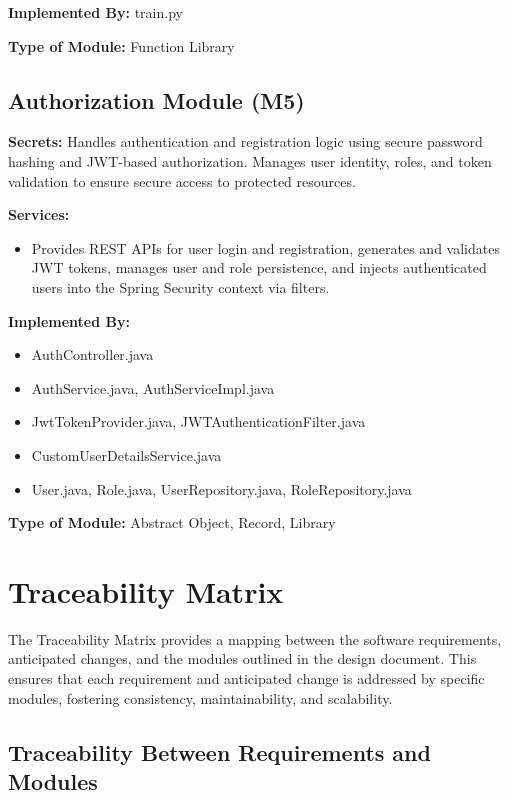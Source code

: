 \documentclass[12pt, titlepage]{article}
\begin{document}
\textbf{Implemented By:} train.py

\textbf{Type of Module:} Function Library

\subsection{Authorization Module (M5)}

\textbf{Secrets:} Handles authentication and registration logic using secure password hashing and JWT-based authorization. Manages user identity, roles, and token validation to ensure secure access to protected resources.

\textbf{Services:} 
\begin{itemize}
    \item Provides REST APIs for user login and registration, generates and validates JWT tokens, manages user and role persistence, and injects authenticated users into the Spring Security context via filters.
\end{itemize}

\textbf{Implemented By:} 
\begin{itemize}
    \item AuthController.java
    \item AuthService.java, AuthServiceImpl.java
    \item JwtTokenProvider.java, JWTAuthenticationFilter.java
    \item CustomUserDetailsService.java
    \item User.java, Role.java, UserRepository.java, RoleRepository.java
\end{itemize}

\textbf{Type of Module:} Abstract Object, Record, Library

\section{Traceability Matrix}

The Traceability Matrix provides a mapping between the software requirements, anticipated changes, and the modules outlined in the design document. This ensures that each requirement and anticipated change is addressed by specific modules, fostering consistency, maintainability, and scalability.

\subsection{Traceability Between Requirements and Modules}
\end{document}
